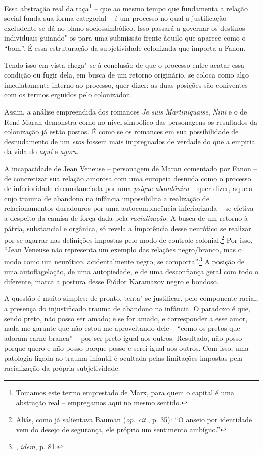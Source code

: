 Essa abstração real da raça\footnote{Tomamos este termo emprestado de
  Marx, para quem o capital é uma abstração real -- empregamos aqui no
  mesmo sentido.} -- que ao mesmo tempo que fundamenta a relação social
funda sua forma categorial -- é um processo no qual a justificação
excludente se dá no plano sociossimbólico. Isso passará a governar os
destinos individuais guiando"-os para uma submissão frente àquilo que
aparece como o ``bom''. É essa estruturação da subjetividade colonizada
que importa a Fanon.

Tendo isso em vista chega"-se à conclusão de que o processo entre acatar
essa condição ou fugir dela, em busca de um retorno originário, se
coloca como algo imediatamente interno ao processo, quer dizer: as duas
posições são coniventes com os termos erguidos pelo colonizador.

Assim, a análise empreendida dos romances \emph{Je suis Martiniquaise},
\emph{Nini} e o de René Maran demonstra como no nível simbólico das
personagens os resultados da colonização já estão postos. É como se os
romances em sua possibilidade de desnudamento de um \emph{etos} fossem
mais impregnados de verdade do que a empiria da vida do \emph{aqui} e
\emph{agora}.

A incapacidade de Jean Veneuse -- personagem de Maran comentado por
Fanon -- de concretizar sua relação amorosa com uma europeia desnuda
como o processo de inferioridade circunstanciada por uma \emph{psique
abandônica} -- quer dizer, aquela cujo trauma de abandono na infância
impossibilita a realização de relacionamentos duradouros por uma
autocomplacência inferiorizada -- se efetiva a despeito da camisa de
força dada pela \emph{racialização}. A busca de um retorno à pátria,
substancial e orgânica, só revela a impotência desse neurótico se
realizar por se agarrar nas definições impostas pelo modo de controle
colonial.\footnote{Aliás, como já salientava Bauman (\emph{op. cit.}, p. 35):
  ``O anseio por identidade vem do desejo de segurança, ele próprio um
  sentimento ambíguo.''} Por isso, ``Jean Veneuse não representa um
exemplo das relações negro/branco, mas o modo como um neurótico,
acidentalmente negro, se comporta''.\footnote{, \emph{idem}, p. 81.} A
posição de uma autoflagelação, de uma autopiedade, e de uma desconfiança
geral com todo o diferente, marca a postura desse Fiódor Karamazov negro
e bondoso.

A questão é muito simples: de pronto, tenta"-se justificar, pelo
componente racial, a presença do injustificado trauma de abandono na
infância. O paradoxo é que, sendo preto, não posso ser amado; e se for
amado, e corresponder a esse amor, nada me garante que não estou me
aproveitando dele -- ``como os pretos que adoram carne branca'' -- por
ser preto igual aos outros. Resultado, não posso porque quero e não
posso porque posso e serei igual aos outros. Com isso, uma patologia
ligada ao trauma infantil é ocultada pelas limitações impostas pela
racialização da própria subjetividade.

